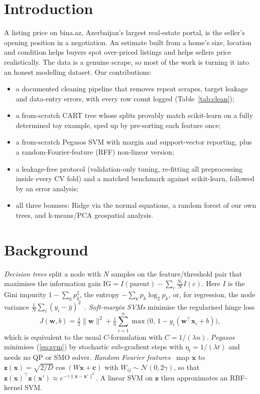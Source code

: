\documentclass[10pt,twocolumn,a4paper]{article}
\begin{document}
\section{Introduction}
A listing price on bina.az, Azerbaijan's largest real-estate portal, is the
seller's opening position in a negotiation. An estimate built from a home's
size, location and condition helps buyers spot over-priced listings and
helps sellers price realistically. The data is a genuine scrape, so most of
the work is turning it into an honest modelling dataset. Our contributions:
\begin{itemize}\setlength\itemsep{0pt}
  \item a documented cleaning pipeline that removes repeat scrapes,
    target leakage and data-entry errors, with every row count logged
    (Table~\ref{tab:clean});
  \item a from-scratch CART tree whose splits provably match scikit-learn
    on a fully determined toy example, sped up by pre-sorting each feature
    once;
  \item a from-scratch Pegasos SVM with margin and support-vector
    reporting, plus a random-Fourier-feature (RFF) non-linear version;
  \item a leakage-free protocol (validation-only tuning, re-fitting all
    preprocessing inside every CV fold) and a matched benchmark against
    scikit-learn, followed by an error analysis;
  \item all three bonuses: Ridge via the normal equations, a random forest
    of our own trees, and k-means/PCA geospatial analysis.
\end{itemize}

\section{Background}
\textit{Decision trees} split a node with $N$ samples on the
feature/threshold pair that maximises the information gain
$\mathrm{IG}=I(\text{parent})-\sum_{c}\tfrac{N_c}{N}I(c)$. Here $I$ is the
Gini impurity $1-\sum_k p_k^2$, the entropy $-\sum_k p_k\log_2 p_k$, or,
for regression, the node variance
$\tfrac1N\sum_i(y_i-\bar y)^2$~\cite{cart}. \textit{Soft-margin SVMs}
minimise the regularised hinge loss
\begin{equation}
  J(\mathbf{w},b)=\tfrac{\lambda}{2}\lVert\mathbf{w}\rVert^{2}
  +\tfrac{1}{n}\sum_{i=1}^{n}\max\!\big(0,\,1-y_i(\mathbf{w}^{\top}\mathbf{x}_i+b)\big),
  \label{eq:svm}
\end{equation}
which is equivalent to the usual $C$-formulation with $C=1/(\lambda n)$.
\textit{Pegasos}~\cite{pegasos} minimises (\ref{eq:svm}) by stochastic
sub-gradient steps with $\eta_t=1/(\lambda t)$ and needs no QP or SMO
solver. \textit{Random Fourier features}~\cite{rff} map $\mathbf{x}$ to
$\mathbf{z}(\mathbf{x})=\sqrt{2/D}\cos(W\mathbf{x}+\mathbf{c})$ with
$W_{ij}\sim\mathcal N(0,2\gamma)$, so that
$\mathbf z(\mathbf x)^{\top}\mathbf z(\mathbf x')\approx
e^{-\gamma\lVert\mathbf x-\mathbf x'\rVert^2}$. A linear SVM on
$\mathbf z$ then approximates an RBF-kernel SVM.
\end{document}
